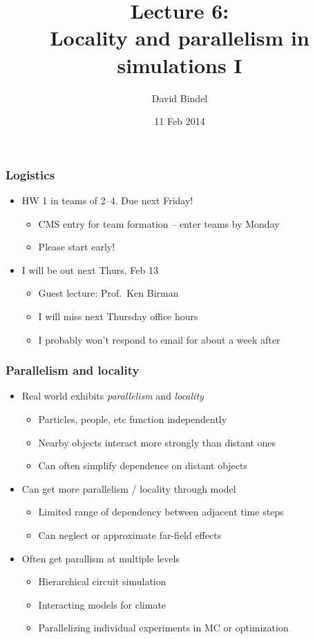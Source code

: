 \documentclass{beamer}
\title[CS 5220, Spring 2014]{Lecture 6: \\
  Locality and parallelism in simulations I}
\author[]{David Bindel} \date[]{11 Feb 2014}
\begin{document}
\begin{frame}
  \titlepage
\end{frame}


\begin{frame}
  \frametitle{Logistics}
  
  \begin{itemize}
  \item HW 1 in teams of 2--4.  Due next Friday!
    \begin{itemize}
    \item CMS entry for team formation -- enter teams by Monday
    \item Please start early!
    \end{itemize}
  \item I will be out next Thurs, Feb 13
    \begin{itemize}
    \item Guest lecture: Prof.~Ken Birman
    \item I will miss next Thursday office hours
    \item I probably won't respond to email for about a week after
    \end{itemize}
  \end{itemize}
\end{frame}


\begin{frame}
  \frametitle{Parallelism and locality}

  \begin{itemize}
  \item Real world exhibits {\em parallelism} and {\em locality}
    \begin{itemize}
    \item Particles, people, etc function independently
    \item Nearby objects interact more strongly than distant ones
    \item Can often simplify dependence on distant objects
    \end{itemize}
  \item Can get more parallelism / locality through model
    \begin{itemize}
    \item Limited range of dependency between adjacent time steps
    \item Can neglect or approximate far-field effects
    \end{itemize}
  \item Often get parallism at multiple levels
    \begin{itemize}
    \item Hierarchical circuit simulation
    \item Interacting models for climate
    \item Parallelizing individual experiments in MC or optimization
    \end{itemize}
  \end{itemize}
\end{frame}
\end{document}
